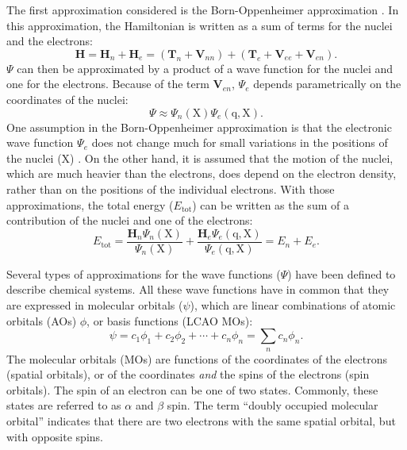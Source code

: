 The first approximation considered is the Born-Oppenheimer approximation \cite{born}. In this approximation, the Hamiltonian is written as a sum of terms for the nuclei and the electrons:
\begin{equation}
\mathbf{H} = \mathbf{H}_n + \mathbf{H}_e = (\mathbf{T}_n + \mathbf{V}_{nn}) + (\mathbf{T}_e + \mathbf{V}_{ee} + \mathbf{V}_{en}).
\label{ch1.eq.hsplit}
\end{equation}
$\Psi$ can then be approximated by a product of a wave function for the nuclei and one for the electrons. Because of the term $\mathbf{V}_{en}$, $\Psi_{e}$ depends parametrically on the coordinates of the nuclei:
\begin{equation}
\Psi \approx \Psi_{n}(\mathrm{X}) \Psi_{e}(\mathrm{q,X}).
\end{equation}
One assumption in the Born-Oppenheimer approximation is that the electronic wave function $\Psi_{e}$ does not change much for small variations in the positions of the nuclei ($\mathrm{X}$) \cite{born}. On the other hand, it is assumed that the motion of the nuclei, which are much heavier than the electrons, does depend on the electron density, rather than on the positions of the individual electrons. With those approximations, the total energy ($E_\mathrm{tot}$) can be written as the sum of a contribution of the nuclei and one of the electrons:
\begin{equation}
E_\mathrm{tot} = \frac{\mathbf{H}_n \Psi_n(\mathrm{X})}{\Psi_n(\mathrm{X})} + \frac{\mathbf{H}_e \Psi_e(\mathrm{q,X})}{\Psi_e(\mathrm{q,X})} = E_{n} + E_{e}.
\end{equation}

Several types of approximations for the wave functions ($\Psi$) have been defined to describe chemical systems. All these wave functions have in common that they are expressed in molecular orbitals ($\psi$), which are linear combinations of atomic orbitals (AOs) $\phi$, or basis functions (LCAO MOs):
\begin{equation}
\psi = c_1 \phi_1 + c_2 \phi_2 + \cdots + c_n \phi_n = \sum_n c_n \phi_n.
\label{ch1.eq.lcaomo}
\end{equation}
The molecular orbitals (MOs) are functions of the coordinates of the electrons (spatial orbitals), or of the coordinates \textit{and} the spins of the electrons (spin orbitals). The spin of an electron can be one of two states. Commonly, these states are referred to as $\alpha$ and $\beta$ spin. The term ``doubly occupied molecular orbital'' indicates that there are two electrons with the same spatial orbital, but with opposite spins.

